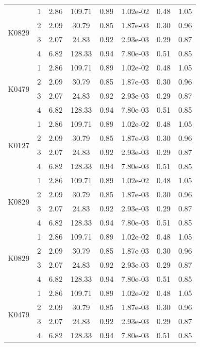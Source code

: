 \documentclass[11pt,a4paper]{article}
\begin{document}
\begin{longtable}{|c|c|c|c|c|c|c|c|}
\multirow{4}{*}{K0829} & 1 & 2.86 & 109.71 & 0.89 & 1.02e-02 & 0.48 & 1.05 \\
& 2 & 2.09 & 30.79 & 0.85 & 1.87e-03 & 0.30 & 0.96 \\
& 3 & 2.07 & 24.83 & 0.92 & 2.93e-03 & 0.29 & 0.87 \\
& 4 & 6.82 & 128.33 & 0.94& 7.80e-03 & 0.51 & 0.85 \\ \hline

\multirow{4}{*}{K0479} & 1 & 2.86 & 109.71 & 0.89 & 1.02e-02 & 0.48 & 1.05 \\
& 2 & 2.09 & 30.79 & 0.85 & 1.87e-03 & 0.30 & 0.96 \\
& 3 & 2.07 & 24.83 & 0.92 & 2.93e-03 & 0.29 & 0.87 \\
& 4 & 6.82 & 128.33 & 0.94& 7.80e-03 & 0.51 & 0.85 \\ \hline


\multirow{4}{*}{K0127} & 1 & 2.86 & 109.71 & 0.89 & 1.02e-02 & 0.48 & 1.05 \\
& 2 & 2.09 & 30.79 & 0.85 & 1.87e-03 & 0.30 & 0.96 \\
& 3 & 2.07 & 24.83 & 0.92 & 2.93e-03 & 0.29 & 0.87 \\
& 4 & 6.82 & 128.33 & 0.94 & 7.80e-03 & 0.51 & 0.85 \\ \hline

\multirow{4}{*}{K0829} & 1 & 2.86 & 109.71 & 0.89 & 1.02e-02 & 0.48 & 1.05 \\
& 2 & 2.09 & 30.79 & 0.85 & 1.87e-03 & 0.30 & 0.96 \\
& 3 & 2.07 & 24.83 & 0.92 & 2.93e-03 & 0.29 & 0.87 \\
& 4 & 6.82 & 128.33 & 0.94 & 7.80e-03 & 0.51 & 0.85 \\ \hline

\multirow{4}{*}{K0829} & 1 & 2.86 & 109.71 & 0.89 & 1.02e-02 & 0.48 & 1.05 \\
& 2 & 2.09 & 30.79 & 0.85 & 1.87e-03 & 0.30 & 0.96 \\
& 3 & 2.07 & 24.83 & 0.92 & 2.93e-03 & 0.29 & 0.87 \\
& 4 & 6.82 & 128.33 & 0.94& 7.80e-03 & 0.51 & 0.85 \\ \hline

\multirow{4}{*}{K0479} & 1 & 2.86 & 109.71 & 0.89 & 1.02e-02 & 0.48 & 1.05 \\
& 2 & 2.09 & 30.79 & 0.85 & 1.87e-03 & 0.30 & 0.96 \\
& 3 & 2.07 & 24.83 & 0.92 & 2.93e-03 & 0.29 & 0.87 \\
& 4 & 6.82 & 128.33 & 0.94& 7.80e-03 & 0.51 & 0.85 \\ \hline


\end{longtable}
\end{document}
